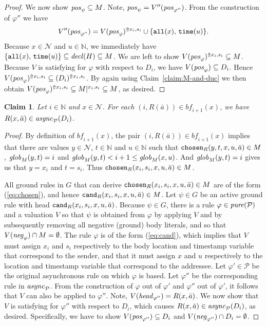 \documentclass{tlp}
\newtheorem{claim}[theorem]{Claim}
\newcommand{\Nat}{\mathbb{N}}  \newcommand{\len}[1]{|#1|} \newcommand{\rom}[1]{\text{\emph{(#1)}}} \newcommand{\romI}{\rom i}
\newcommand{\ded}{\mathcal{P}}
\newcommand{\rl}{\varphi}
\newcommand{\head}[1]{\fname{head}_{#1}}
\newcommand{\bpos}[1]{\fname{pos}_{#1}}
\newcommand{\bneg}[1]{\fname{neg}_{#1}}
\newcommand{\grl}{\psi}
\newcommand{\nw}{\mathcal{N}}
\newcommand{\addlt}[3]{#1^{\Uparrow#2,#3}}
\newcommand{\projlt}[3]{#1|^{#2,#3}}
\newcommand{\reltime}{\pred{time}}
\newcommand{\relall}{\pred{all}}
\newcommand{\chosen}{\pred{chosen}}
\newcommand{\cand}{\pred{cand}}
\newcommand{\decl}[1]{\fname{decl}(#1)}
\newcommand{\pure}[1]{\fname{pure}(#1)}
\newcommand{\cnfb}{\mathit{bf}}
\newcommand{\pair}[2]{(#1,#2)}
\newcommand{\async}[1]{\fname{async}_{#1}}
\newcommand{\mstep}[1]{(#1)}
\newcommand{\grded}{G}
\newcommand{\globM}[1]{\fname{glob}_{M}(#1)}
\begin{document}
\begin{appendix}
\begin{proof}
We now show $\bpos{\grl}\subseteq M$. Note, $\bpos{\grl}=V''(\bpos{\rl''})$.
From the construction of $\rl''$ we have 
\[
V''(\bpos{\rl''})=\addlt{V(\bpos{\rl})}{x_{i}}{s_{i}}\cup\{\relall(x),\,\reltime(u)\}.
\]
Because $x\in\nw$ and $u\in\Nat$, we immediately have $\{\relall(x),\,\reltime(u)\}\subseteq\decl H\subseteq M$.
We are left to show $\addlt{V(\bpos{\rl})}{x_{i}}{s_{i}}\subseteq M$.
Because $V$ is satisfying for $\rl$ with respect to $D_{i}$, we
have $V(\bpos{\rl})\subseteq D_{i}$. Hence $\addlt{V(\bpos{\rl})}{x_{i}}{s_{i}}\subseteq\addlt{(D_{i})}{x_{i}}{s_{i}}$.
By again using Claim~\ref{claim:M-and-duc} we then obtain $\addlt{V(\bpos{\rl})}{x_{i}}{s_{i}}\subseteq\projlt M{x_{i}}{s_{i}}\subseteq M$,
as desired.\end{proof}



\tline



\begin{claim}\label{claim:bufM-in-async}Let $i\in\Nat$ and $x\in\nw$.
For each $\pair i{R(\bar{a})}\in\cnfb_{i+1}(x)$, we have $R(x,\bar{a})\in\async{\ded}\mstep{D_{i}}$.\end{claim}

\begin{proof}

By definition of $\cnfb_{i+1}(x)$, the pair $\pair i{R(\bar{a})}\in\cnfb_{i+1}(x)$
implies that there are values $y\in\nw$, $t\in\Nat$ and $u\in\Nat$
such that $\chosen_{R}(y,t,x,u,\bar{a})\in M$, $\globM{y,t}=i$ and
$\globM{y,t}<i+1\leq\globM{x,u}$. And $\globM{y,t}=i$ gives us that
$y=x_{i}$ and $t=s_{i}$. Thus $\chosen_{R}(x_{i},s_{i},x,u,\bar{a})\in M$.

All ground rules in $\grded$ that can derive $\chosen_{R}(x_{i},s_{i},x,u,\bar{a})\in M$
are of the form (\ref{eq:chosen}), and hence $\cand_{R}(x_{i},s_{i},x,u,\bar{a})\in M$.
Let $\grl\in\grded$ be an active ground rule with head $\cand_{R}(x_{i},s_{i},x,u,\bar{a})$.
Because $\grl\in\grded$, there is a rule $\rl\in\pure{\ded}$ and
a valuation $V$ so that $\grl$ is obtained from $\rl$ by applying
$V$ and by subsequently removing all negative (ground) body literals,
and so that $V(\bneg{\rl})\cap M=\emptyset$. The rule $\rl$ is of
the form (\ref{eq:cand}), which implies that $V$ must assign $x_{i}$
and $s_{i}$ respectively to the body location and timestamp variable
that correspond to the sender, and that it must assign $x$ and $u$
respectively to the location and timestamp variable that correspond
to the addressee. Let $\rl'\in\ded$ be the original asynchronous
rule on which $\rl$ is based. Let $\rl''$ be the corresponding rule
in $\async{\ded}$. From the construction of $\rl$ out of $\rl'$
and $\rl''$ out of $\rl'$, it follows that $V$ can also be applied
to $\rl''$.  Note, $V(\head{\rl''})=R(x,\bar{a})$. We now show
that $V$ is satisfying for $\rl''$ with respect to $D_{i}$, which
causes $R(x,\bar{a})\in\async{\ded}\mstep{D_{i}}$, as desired. Specifically,
we have to show $V(\bpos{\rl''})\subseteq D_{i}$ and $V(\bneg{\rl''})\cap D_{i}=\emptyset$.


\end{proof}
\end{appendix}
\end{document}
